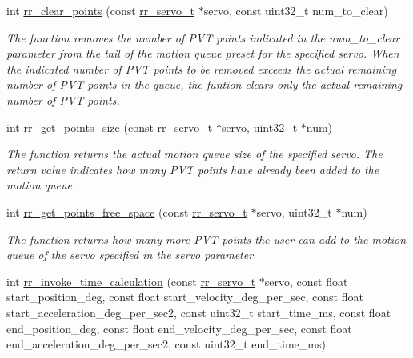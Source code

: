 \begin{DoxyCompactItemize}
int \hyperlink{group___trajectory_ga5a39de7fa2777073bbc4d9fc60fa5c38}{rr\+\_\+clear\+\_\+points} (const \hyperlink{structrr__servo__t}{rr\+\_\+servo\+\_\+t} $\ast$servo, const uint32\+\_\+t num\+\_\+to\+\_\+clear)
\begin{DoxyCompactList}\small\item\em The function removes the number of P\+VT points indicated in the \textquotesingle{}num\+\_\+to\+\_\+clear\textquotesingle{} parameter from the tail of the motion queue preset for the specified servo. When the indicated number of P\+VT points to be removed exceeds the actual remaining number of P\+VT points in the queue, the funtion clears only the actual remaining number of P\+VT points. \end{DoxyCompactList}\item 
int \hyperlink{group___trajectory_gae6ed290842e08d349dd86bb1264e6a17}{rr\+\_\+get\+\_\+points\+\_\+size} (const \hyperlink{structrr__servo__t}{rr\+\_\+servo\+\_\+t} $\ast$servo, uint32\+\_\+t $\ast$num)
\begin{DoxyCompactList}\small\item\em The function returns the actual motion queue size of the specified servo. The return value indicates how many P\+VT points have already been added to the motion queue. \end{DoxyCompactList}\item 
int \hyperlink{group___trajectory_gaafd0d575c047ed269664fbc760a640c1}{rr\+\_\+get\+\_\+points\+\_\+free\+\_\+space} (const \hyperlink{structrr__servo__t}{rr\+\_\+servo\+\_\+t} $\ast$servo, uint32\+\_\+t $\ast$num)
\begin{DoxyCompactList}\small\item\em The function returns how many more P\+VT points the user can add to the motion queue of the servo specified in the \textquotesingle{}servo\textquotesingle{} parameter. \end{DoxyCompactList}\item 
int \hyperlink{group___trajectory_gabaa2275097c9ec4bb2807b65d83e3303}{rr\+\_\+invoke\+\_\+time\+\_\+calculation} (const \hyperlink{structrr__servo__t}{rr\+\_\+servo\+\_\+t} $\ast$servo, const float start\+\_\+position\+\_\+deg, const float start\+\_\+velocity\+\_\+deg\+\_\+per\+\_\+sec, const float start\+\_\+acceleration\+\_\+deg\+\_\+per\+\_\+sec2, const uint32\+\_\+t start\+\_\+time\+\_\+ms, const float end\+\_\+position\+\_\+deg, const float end\+\_\+velocity\+\_\+deg\+\_\+per\+\_\+sec, const float end\+\_\+acceleration\+\_\+deg\+\_\+per\+\_\+sec2, const uint32\+\_\+t end\+\_\+time\+\_\+ms)

\end{DoxyCompactItemize}
